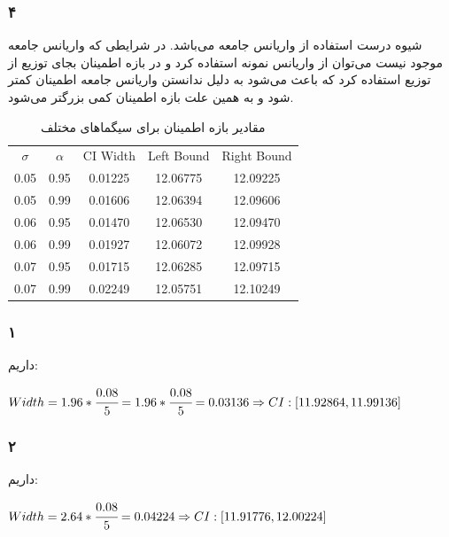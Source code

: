 \documentclass[12pt]{article}
\begin{document}
\begin{itemize}
	\subsubsection{۴}
	
	شیوه درست استفاده از واریانس جامعه می‌باشد. در شرایطی که واریانس جامعه موجود نیست می‌توان از واریانس نمونه استفاده کرد و در بازه اطمینان بجای توزیع 
	از توزیع 
	استفاده کرد که باعث می‌شود به دلیل ندانستن واریانس جامعه اطمینان کمتر شود و به همین علت بازه اطمینان کمی بزرگتر می‌شود. 
	\begin{table}[ht]
		\centering
		\caption{مقادیر بازه اطمینان برای سیگماهای مختلف}
		\begin{latin}
		\label{tab:ci-calculations}
		\begin{tabular}{S[table-format=1.5] S[table-format=1.5] S[table-format=1.5] S[table-format=2.5] S[table-format=2.5]}
			{$\sigma$} & {$\alpha$} & {CI Width} & {Left Bound} & {Right Bound} \\
			0.05 & 0.95 & 0.01225 & 12.06775 & 12.09225 \\
			0.05 & 0.99 & 0.01606 & 12.06394 & 12.09606 \\
			0.06 &0.95 & 0.01470 & 12.06530 & 12.09470 \\
			0.06 & 0.99& 0.01927 & 12.06072 & 12.09928 \\
			0.07 & 0.95 & 0.01715 & 12.06285 & 12.09715 \\
			0.07 &0.99 & 0.02249 & 12.05751 & 12.10249 \\
		\end{tabular}
				\end{latin}
	\end{table}

\subsubsection{۱}
داریم:
\begin{latin}
	$
	Width = 1.96 * \cfrac{0.08}{5} = 1.96 * \cfrac{0.08}{5} = 0.03136 \Rightarrow CI: [11.92864, 11.99136]
	$
\end{latin}
\subsubsection{۲}
داریم:
\begin{latin}
	$
	Width = 2.64 * \cfrac{0.08}{5}  = 0.04224 \Rightarrow CI: [11.91776, 12.00224]
	$
\end{latin}

\end{itemize}
\end{document}
